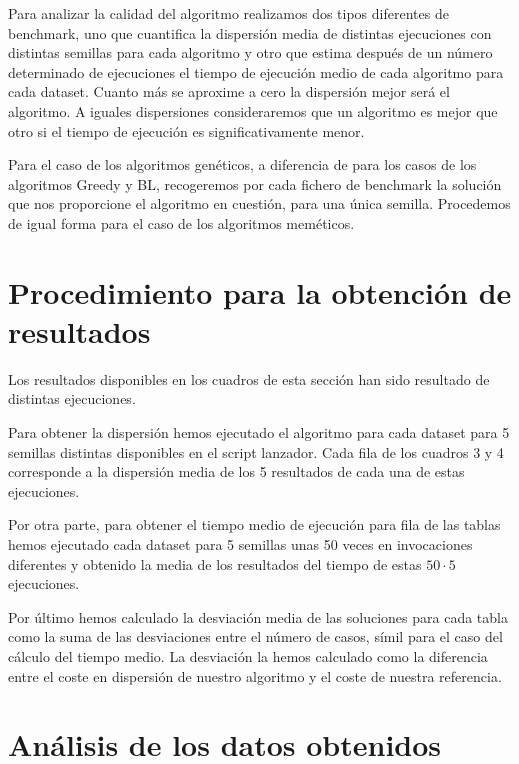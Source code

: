 Para analizar la calidad del algoritmo realizamos dos tipos diferentes de benchmark, uno que cuantifica la dispersión
media de distintas ejecuciones con distintas semillas para cada algoritmo y otro que estima después de un número
determinado de ejecuciones el tiempo de ejecución medio de cada algoritmo para cada dataset. Cuanto más se aproxime
a cero la dispersión mejor será el algoritmo. A iguales dispersiones consideraremos que un algoritmo es mejor que otro
si el tiempo de ejecución es significativamente menor.

Para el caso de los algoritmos genéticos, a diferencia de para los casos de los algoritmos Greedy y BL, recogeremos 
por cada fichero de benchmark la solución que nos proporcione el algoritmo en cuestión, para una única semilla. Procedemos
de igual forma para el caso de los algoritmos meméticos.

\section{Procedimiento para la obtención de resultados}

Los resultados disponibles en los cuadros de esta sección han sido resultado de distintas ejecuciones.

Para obtener la dispersión hemos ejecutado el algoritmo para cada dataset para 5 semillas distintas disponibles
en el script lanzador. Cada fila de los cuadros 3 y 4 corresponde a la dispersión media de los 5 resultados de cada
una de estas ejecuciones.

Por otra parte, para obtener el tiempo medio de ejecución para fila de las tablas hemos ejecutado cada dataset
para 5 semillas unas 50 veces en invocaciones diferentes y obtenido la media de los resultados del tiempo de estas
$ 50 \cdot 5 $ ejecuciones.

Por último hemos calculado la desviación media de las soluciones para cada tabla como la suma de las desviaciones
entre el número de casos, símil para el caso del cálculo del tiempo medio. La desviación la hemos calculado como la
diferencia entre el coste en dispersión de nuestro algoritmo y el coste de nuestra referencia.



\section{Análisis de los datos obtenidos}

